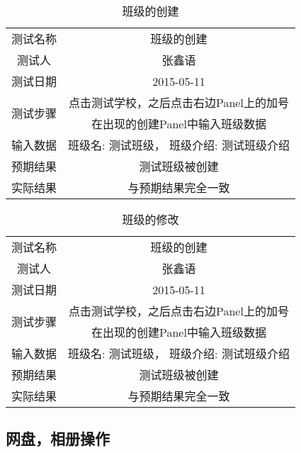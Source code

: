 \begin{table}[H]
  \centering
  \caption{班级的创建}
  \label{tab:3}
  \begin{tabular}{cc}
    \toprule
    测试名称 & 班级的创建  \\

    测试人 & 张鑫语 \\
    测试日期 & 2015-05-11 \\

    \midrule
    \multirow{2}{*}{测试步骤}
             & 点击测试学校，之后点击右边Panel上的加号 \\
             & 在出现的创建Panel中输入班级数据 \\

    \midrule
    输入数据 		& 班级名: 测试班级， 班级介绍: 测试班级介绍 \\
    预期结果 		& 测试班级被创建 \\
    实际结果             & 与预期结果完全一致 \\
    \bottomrule
  \end{tabular}
\end{table}

\begin{table}[H]
  \centering
  \caption{班级的修改}
  \label{tab:4}
  \begin{tabular}{cc}
    \toprule
    测试名称 & 班级的创建  \\

    测试人 & 张鑫语 \\
    测试日期 & 2015-05-11 \\

    \midrule
    \multirow{2}{*}{测试步骤} 		& 点击测试学校，之后点击右边Panel上的加号 \\
    & 在出现的创建Panel中输入班级数据 \\

    \midrule
    输入数据 		& 班级名: 测试班级， 班级介绍: 测试班级介绍 \\
    预期结果 		& 测试班级被创建 \\
    实际结果             & 与预期结果完全一致 \\
    \bottomrule
  \end{tabular}
\end{table}


\subsection{网盘，相册操作}


